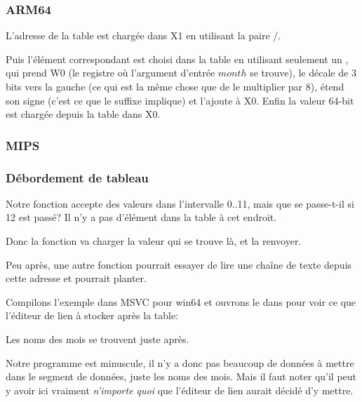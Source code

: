 \subsubsection{ARM64}




L'adresse de la table est chargée dans X1 en utilisant la paire \ADRP/\ADD.

Puis l'élément correspondant est choisi dans la table en utilisant seulement un \LDR,
qui prend W0 (le registre où l'argument d'entrée $month$ se trouve), le décale de
3 bits vers la gauche (ce qui est la même chose que de le multiplier par 8), étend
son signe (c'est ce que le suffixe  implique) et l'ajoute à X0.
Enfin la valeur 64-bit est chargée depuis la table dans X0.

\subsubsection{MIPS}



\subsubsection{Débordement de tableau}

Notre fonction accepte des valeurs dans l'intervalle 0..11, mais que se passe-t-il
si 12 est passé?
Il n'y a pas d'élément dans la table à cet endroit.

Donc la fonction va charger la valeur qui se trouve là, et la renvoyer.

Peu après, une autre fonction pourrait essayer de lire une chaîne de texte depuis
cette adresse et pourrait planter.

Compilons l'exemple dans MSVC pour win64 et ouvrons le dans \IDA pour voir ce que
l'éditeur de lien à stocker après la table:



Les noms des mois se trouvent juste après.

Notre programme est minuscule, il n'y a donc pas beaucoup de données à mettre dans
le segment de données, juste les noms des mois.
Mais il faut noter qu'il peut y avoir ici vraiment \emph{n'importe quoi} que l'éditeur
de lien aurait décidé d'y mettre.


